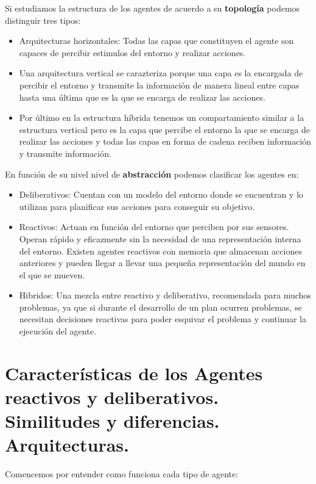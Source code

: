 \documentclass[12pt]{article}
\begin{document}
Si estudiamos la estructura de los agentes de acuerdo a su \textbf{topología}
podemos distinguir tres tipos:

\begin{itemize}
\item Arquitecturas horizontales: Todas las capas que constituyen el
  agente son capaces de percibir estimulos del entorno y realizar
  acciones.
\item Una arquitectura vertical se carazteriza porque una capa es la
  encargada de percibir el entorno y transmite la información de
  manera lineal entre capas hasta una última que es la que se encarga
  de realizar las acciones.
\item Por último en la estructura híbrida tenemos un compartamiento
  similar a la estructura vertical pero es la capa que percibe el
  entorno la que se encarga de realizar las acciones y todas las capas
  en forma de cadena reciben información y transmite información.
\end{itemize}

En función de su nivel nivel de \textbf{abstracción} podemos
clasificar los agentes en:

\begin{itemize}
\item Deliberativos: Cuentan con un modelo del entorno donde se
  encuentran y lo utilizan para planificar sus acciones para conseguir
  su objetivo.
\item Reactivos: Actuan en función del entorno que perciben por sus
  sensores. Operan rápido y eficazmente sin la necesidad de una
  representación interna del entorno. Existen agentes reactivos con
  memoria que almacenan acciones anteriores y pueden llegar a llevar
  una pequeña representación del mundo en el que se mueven.
\item Hibridos: Una mezcla entre reactivo y deliberativo, recomendada
  para muchos problemas, ya que si durante el desarrollo de un plan
  ocurren problemas, se necesitan decisiones reactivas para poder
  esquivar el problema y continuar la ejecución del agente.
\end{itemize}


\section{Características de los Agentes reactivos y deliberativos. Similitudes y diferencias. Arquitecturas.}

Comencemos por entender como funciona cada tipo de agente:
\end{document}
